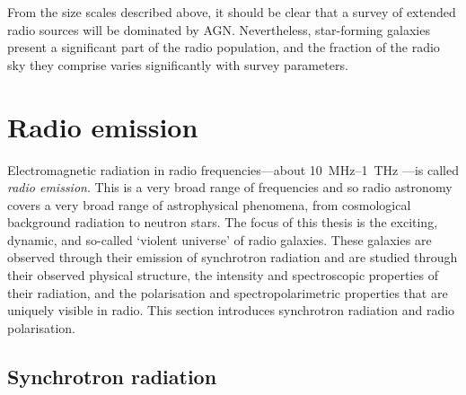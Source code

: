 \documentclass[11pt, a4paper]{book}
\newcommand{\defn}[1]{\emph{#1}}
\begin{document}
    From the size scales described above, it should be clear that a survey of extended radio sources will be dominated by AGN. Nevertheless, star-forming galaxies present a significant part of the radio population, and the fraction of the radio sky they comprise varies significantly with survey parameters.

\section{Radio emission}
\label{sec:radio-astronomy}

    Electromagnetic radiation in radio frequencies---about 10~MHz--1~THz \citep{condon_essential_2016}---is called \defn{radio emission}. This is a very broad range of frequencies and so radio astronomy covers a very broad range of astrophysical phenomena, from cosmological background radiation to neutron stars. The focus of this thesis is the exciting, dynamic, and so-called `violent universe' of radio galaxies. These galaxies are observed through their emission of synchrotron radiation and are studied through their observed physical structure, the intensity and spectroscopic properties of their radiation, and the polarisation and spectropolarimetric properties that are uniquely visible in radio. This section introduces synchrotron radiation and radio polarisation.

    \subsection{Synchrotron radiation}
    \label{sec:synchrotron}
\end{document}
